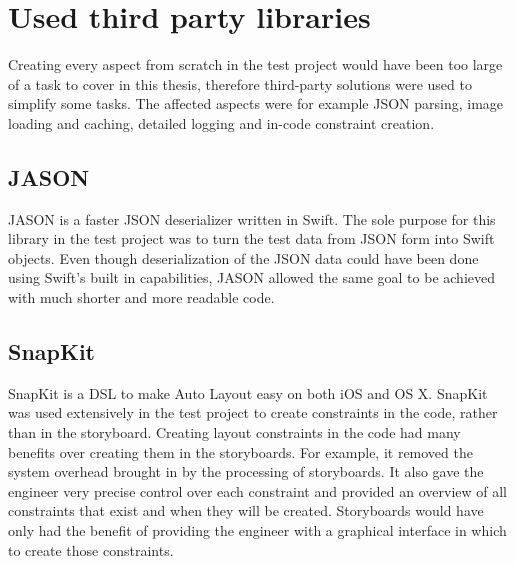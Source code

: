 \documentclass[a4paper,12pt]{article}
\begin{document}
\newpage
\section{Used third party libraries}
Creating every aspect from scratch in the test project would have been too large of a task to cover in this thesis, therefore third-party solutions were used to simplify some tasks. The affected aspects were for example JSON parsing, image loading and caching, detailed logging and in-code constraint creation.

\subsection{JASON}
JASON is a faster JSON deserializer written in Swift.\cite{JASON} The sole purpose for this library in the test project was to turn the test data from JSON form into Swift objects. Even though deserialization of the JSON data could have been done using Swift's built in capabilities, JASON allowed the same goal to be achieved with much shorter and more readable code.

\subsection{SnapKit}
SnapKit is a DSL to make Auto Layout easy on both iOS and OS X.\cite{SnapKit} SnapKit was used extensively in the test project to create constraints in the code, rather than in the storyboard. Creating layout constraints in the code had many benefits over creating them in the storyboards. For example, it removed the system overhead brought in by the processing of storyboards. It also gave the engineer very precise control over each constraint and provided an overview of all constraints that exist and when they will be created. Storyboards would have only had the benefit of providing the engineer with a graphical interface in which to create those constraints.
\end{document}
